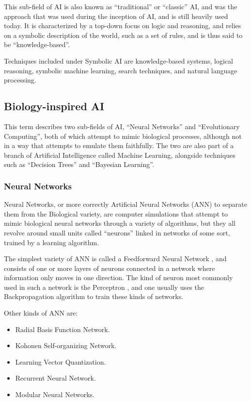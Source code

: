 \documentclass[]{report}
\begin{document}
This sub-field of AI is also known as ``traditional'' or ``classic'' AI, and was
the approach that was used during the inception of AI, and is still heavily used
today. It is characterized by a top-down focus on logic and reasoning, and
relies on a symbolic description of the world, such as a set of rules, and is
thus said to be ``knowledge-based''.

Techniques included under Symbolic AI are knowledge-based systems, logical
reasoning, symbolic machine learning, search techniques, and natural language
processing.

\subsection{Biology-inspired AI}
\label{sec:biology-inspired-ai}

This term describes two sub-fields of AI, ``Neural Networks'' and ``Evolutionary
Computing'', both of which attempt to mimic biological processes, although not
in a way that attempts to emulate them faithfully. The two are also part of a
branch of Artificial Intelligence called Machine Learning, alongside techniques
such as ``Decision Trees'' and ``Bayesian Learning''.

\subsubsection{Neural Networks}
\label{sec:neural-networks}

Neural Networks, or more correctly Artificial Neural Networks (ANN) to separate
them from the Biological variety, are computer simulations that attempt to mimic
biological neural networks through a variety of algorithms, but they all revolve
around small units called ``neurons'' linked in networks of some sort, trained
by a learning algorithm.

The simplest variety of ANN is called a Feedforward Neural Network
\citep{wikipediafeedforward}, and consists of one or more layers of neurons
connected in a network where information only moves in one direction. The kind
of neuron most commonly used in such a network is the Perceptron
\citep{minsky1969perceptrons}, and one usually uses the Backpropagation
\citep{wikipediabackpropagation} algorithm to train these kinds of networks.

Other kinds of ANN are:
\begin{itemize}
\item Radial Basis Function Network.
\item Kohonen Self-organizing Network.
\item Learning Vector Quantization.
\item Recurrent Neural Network.
\item Modular Neural Networks.
\end{itemize}
\end{document}
